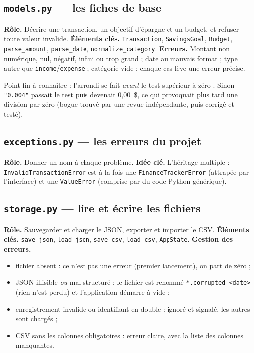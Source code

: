 \documentclass[11pt,a4paper]{article}
\newcommand{\code}[1]{{\NoAutoSpacing\texttt{#1}}}
\begin{document}
\subsection{\code{models.py} --- les fiches de base}
\textbf{Rôle.} Décrire une transaction, un objectif d'épargne et un budget, et refuser toute
valeur invalide. \textbf{Éléments clés.} \code{Transaction}, \code{SavingsGoal},
\code{Budget}, \code{parse\_amount}, \code{parse\_date}, \code{normalize\_category}.
\textbf{Erreurs.} Montant non numérique, nul, négatif, infini ou trop grand ; date au mauvais
format ; type autre que \code{income}/\code{expense} ; catégorie vide : chaque cas lève une
erreur précise.

Point fin à connaître : l'arrondi se fait \emph{avant} le test \og supérieur à zéro \fg.
Sinon \code{"0.004"} passait le test puis devenait 0,00~\$, ce qui provoquait plus tard une
division par zéro (bogue trouvé par une revue indépendante, puis corrigé et testé).

\subsection{\code{exceptions.py} --- les erreurs du projet}
\textbf{Rôle.} Donner un nom à chaque problème. \textbf{Idée clé.} L'héritage multiple :
\code{InvalidTransactionError} est à la fois une \code{FinanceTrackerError} (attrapée par
l'interface) et une \code{ValueError} (comprise par du code Python générique).

\subsection{\code{storage.py} --- lire et écrire les fichiers}
\textbf{Rôle.} Sauvegarder et charger le JSON, exporter et importer le CSV. \textbf{Éléments
clés.} \code{save\_json}, \code{load\_json}, \code{save\_csv}, \code{load\_csv},
\code{AppState}. \textbf{Gestion des erreurs.}
\begin{itemize}
  \item fichier absent : ce n'est pas une erreur (premier lancement), on part de zéro ;
  \item JSON illisible \emph{ou} mal structuré : le fichier est renommé
        \code{*.corrupted-<date>} (rien n'est perdu) et l'application démarre à vide ;
  \item enregistrement invalide ou identifiant en double : ignoré et signalé, les autres sont
        chargés ;
  \item CSV sans les colonnes obligatoires : erreur claire, avec la liste des colonnes
        manquantes.
\end{itemize}


\end{document}
